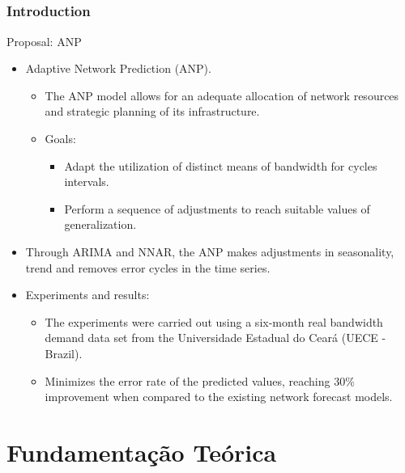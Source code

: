 \documentclass[aspectratio=169]{beamer}
\begin{document}
\subsection{}
\begin{frame}
\frametitle{Introduction}
\begin{block}{Proposal: ANP}
    \begin{itemize}
        \item Adaptive Network Prediction (ANP).
        \begin{itemize}[triangle]\small
        	\item The ANP model allows for an adequate allocation of network resources and strategic planning of its infrastructure.
            \item Goals:
            \begin{itemize}[square]\small
            	\item Adapt the utilization of distinct means of bandwidth for cycles intervals.
            	\item Perform a sequence of adjustments to reach suitable values of generalization.
            \end{itemize}
        \end{itemize}
        \item Through ARIMA and NNAR, the ANP makes adjustments in seasonality, trend and removes error cycles in the time series.
        \item Experiments and results:
        \begin{itemize}[triangle]\small
        	\item The experiments were carried out using a six-month real bandwidth demand data set from the Universidade Estadual do Ceará (UECE - Brazil).
        	\item Minimizes the error rate of the predicted values, reaching 30\% improvement when compared to the existing network forecast models.
        \end{itemize}
    \end{itemize}
\end{block}
\end{frame}

\section{Fundamentação Teórica}
\end{document}
